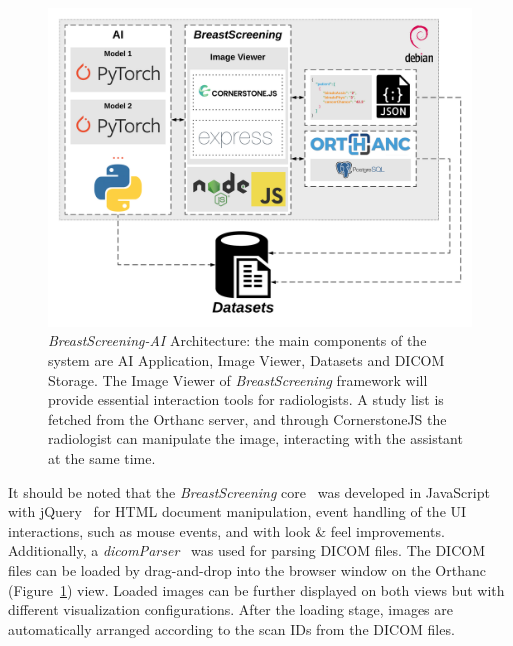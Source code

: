 \begin{figure}[htbp]
\centering
\includegraphics[width=0.80\linewidth]{images/fig041}
\caption{{\it BreastScreening-AI} Architecture: the main components of the system are AI Application, Image Viewer, Datasets and DICOM Storage. The Image Viewer of {\it BreastScreening} framework will provide essential interaction tools for radiologists. A study list is fetched from the Orthanc server, and through CornerstoneJS the radiologist can manipulate the image, interacting with the assistant at the same time.}
\label{fig:fig041}
\end{figure}

It should be noted that the {\it BreastScreening} core~\cite{https://doi.org/10.13140/rg.2.2.29816.70409} was developed in JavaScript with jQuery\footnotemark[39]~\cite{depeursinge2011mobile} for \ac{HTML} document manipulation, event handling of the \ac{UI} interactions, such as mouse events, and with look \& feel improvements.
Additionally, a {\it dicomParser}~\cite{zhang2015dicom} was used for parsing \ac{DICOM} files.
The \ac{DICOM} files can be loaded by drag-and-drop into the browser window on the Orthanc  (Figure~\ref{fig:fig041}) view.
Loaded images can be further displayed on both views but with different visualization configurations.
After the loading stage, images are automatically arranged according to the scan IDs from the \ac{DICOM} files.


